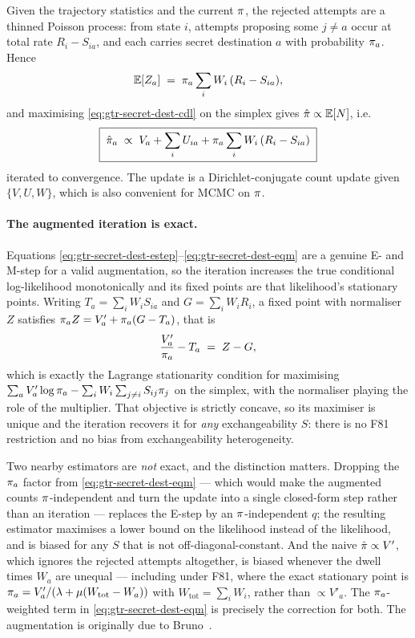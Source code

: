 Given the trajectory statistics and the current $\pi$, the rejected
attempts are a thinned Poisson process: from state $i$, attempts
proposing some $j \ne a$ occur at total rate $R_i - S_{ia}$, and each
carries secret destination $a$ with probability $\pi_a$. Hence
\begin{equation}
\label{eq:gtr-secret-dest-estep}
\mathbb{E}[Z_a] \;=\; \pi_a \sum_i W_i\,(R_i - S_{ia}),
\end{equation}
and maximising \eqref{eq:gtr-secret-dest-cdl} on the simplex gives
$\hat{\pi} \propto \mathbb{E}[N]$, i.e.
\begin{equation}
\label{eq:gtr-secret-dest-eqm}
\boxed{\;
  \hat{\pi}_a \;\propto\;
   V_a + \sum_i U_{ia} + \pi_a \sum_i W_i\,(R_i - S_{ia})
  \;}
\end{equation}
iterated to convergence. The update is a Dirichlet-conjugate count
update given $\{V, U, W\}$, which is also convenient for MCMC on $\pi$.

\paragraph{The augmented iteration is exact.}
Equations \eqref{eq:gtr-secret-dest-estep}--\eqref{eq:gtr-secret-dest-eqm}
are a genuine E- and M-step for a valid augmentation, so the iteration
increases the true conditional log-likelihood monotonically and its fixed
points are that likelihood's stationary points. Writing
$T_a = \sum_i W_i S_{ia}$ and $G = \sum_i W_i R_i$, a fixed point with
normaliser $Z$ satisfies $\pi_a Z = V'_a + \pi_a (G - T_a)$, that is
\begin{equation}
\label{eq:gtr-secret-dest-stationary}
\frac{V'_a}{\pi_a} - T_a \;=\; Z - G ,
\end{equation}
which is exactly the Lagrange stationarity condition for maximising
$\sum_a V'_a \log \pi_a - \sum_i W_i \sum_{j \ne i} S_{ij}\pi_j$ on the
simplex, with the normaliser playing the role of the multiplier. That
objective is strictly concave, so its maximiser is unique and the
iteration recovers it for \emph{any} exchangeability $S$: there is no F81
restriction and no bias from exchangeability heterogeneity.

Two nearby estimators are \emph{not} exact, and the distinction matters.
Dropping the $\pi_a$ factor from \eqref{eq:gtr-secret-dest-eqm} --- which
would make the augmented counts $\pi$-independent and turn the update
into a single closed-form step rather than an iteration --- replaces the
E-step by an $\pi$-independent $q$; the resulting estimator maximises a
lower bound on the likelihood instead of the likelihood, and is biased
for any $S$ that is not off-diagonal-constant. And the naive
$\hat{\pi} \propto V'$, which ignores the rejected attempts altogether, is
biased whenever the dwell times $W_a$ are unequal --- including under
F81, where the exact stationary point is
$\pi_a = V'_a / (\lambda + \mu(W_{\mathrm{tot}} - W_a))$ with
$W_{\mathrm{tot}} = \sum_i W_i$, rather than $\propto V'_a$. The
$\pi_a$-weighted term in \eqref{eq:gtr-secret-dest-eqm} is precisely the
correction for both. The augmentation is originally due to Bruno~\citep{Bruno1996}.


